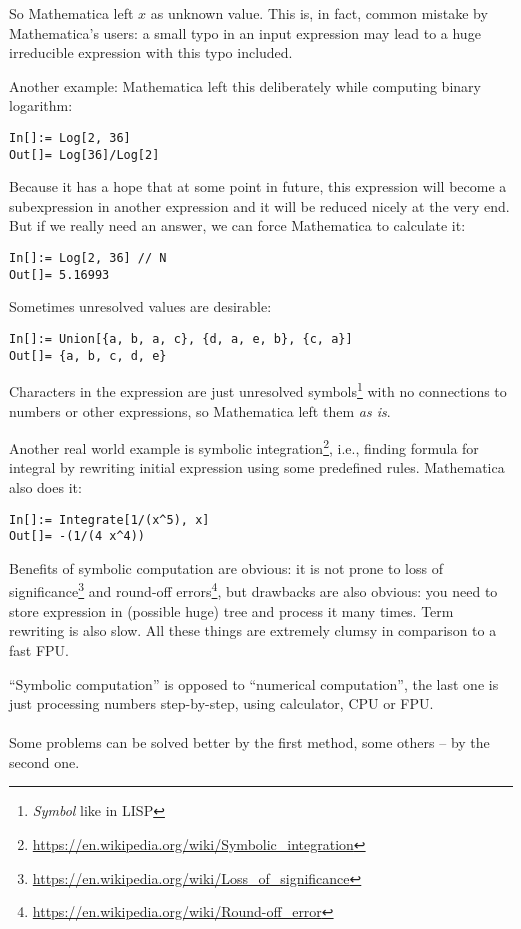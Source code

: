 So Mathematica left $x$ as unknown value.
This is, in fact, common mistake by Mathematica's users: a small typo in an input expression may lead to a huge irreducible expression with this typo included.

Another example: Mathematica left this deliberately while computing binary logarithm:

\begin{lstlisting}
In[]:= Log[2, 36]
Out[]= Log[36]/Log[2]
\end{lstlisting}

Because it has a hope that at some point in future, this expression will become a subexpression in another expression and 
it will be reduced nicely at the very end.
But if we really need an answer, we can force Mathematica to calculate it:

\begin{lstlisting}
In[]:= Log[2, 36] // N
Out[]= 5.16993
\end{lstlisting}

Sometimes unresolved values are desirable:

\begin{lstlisting}
In[]:= Union[{a, b, a, c}, {d, a, e, b}, {c, a}]
Out[]= {a, b, c, d, e}
\end{lstlisting}

Characters in the expression are just unresolved symbols\footnote{\textit{Symbol} like in LISP} with no connections to numbers or other expressions, 
so Mathematica left them \textit{as is}.

Another real world example is symbolic integration\footnote{\url{https://en.wikipedia.org/wiki/Symbolic_integration}}, 
i.e., finding formula for integral by rewriting initial expression using some predefined rules.
Mathematica also does it:

\begin{lstlisting}
In[]:= Integrate[1/(x^5), x]
Out[]= -(1/(4 x^4))
\end{lstlisting}

Benefits of symbolic computation are obvious: it is not prone to loss of significance\footnote{\url{https://en.wikipedia.org/wiki/Loss_of_significance}} and 
round-off errors\footnote{\url{https://en.wikipedia.org/wiki/Round-off_error}}, but drawbacks are also obvious: you need to store expression in (possible huge) tree
and process it many times.
Term rewriting is also slow.
All these things are extremely clumsy in comparison to a fast \ac{FPU}.

``Symbolic computation'' is opposed to ``numerical computation'', the last one is just processing numbers step-by-step, using calculator, \ac{CPU} or \ac{FPU}.\\
\\
Some problems can be solved better by the first method, some others -- by the second one.

